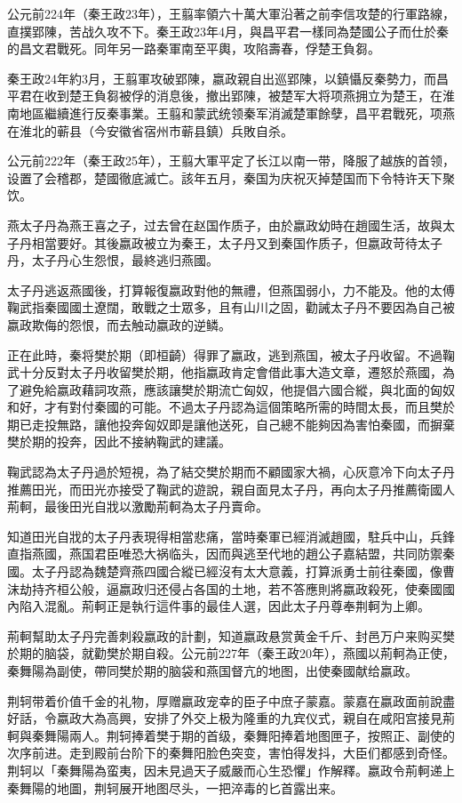 公元前224年（秦王政23年），王翦率領六十萬大軍沿著之前李信攻楚的行軍路線，直撲郢陳，苦战久攻不下。秦王政23年4月，與昌平君一樣同為楚國公子而仕於秦的昌文君戰死。同年另一路秦軍南至平輿，攻陷壽春，俘楚王負芻。

秦王政24年約3月，王翦軍攻破郢陳，嬴政親自出巡郢陳，以鎮懾反秦勢力，而昌平君在收到楚王負芻被俘的消息後，撤出郢陳，被楚军大将项燕拥立为楚王，在淮南地區繼續進行反秦事業。王翦和蒙武统领秦军消滅楚軍餘孽，昌平君戰死，项燕在淮北的蕲县（今安徽省宿州市蕲县鎮）兵敗自杀。

公元前222年（秦王政25年），王翦大軍平定了长江以南一带，降服了越族的首领，设置了会稽郡，楚國徹底滅亡。該年五月，秦国为庆祝灭掉楚国而下令特许天下聚饮。

燕太子丹為燕王喜之子，过去曾在赵国作质子，由於嬴政幼時在趙國生活，故與太子丹相當要好。其後嬴政被立为秦王，太子丹又到秦国作质子，但嬴政苛待太子丹，太子丹心生怨恨，最終逃归燕國。

太子丹逃返燕國後，打算報復嬴政對他的無禮，但燕国弱小，力不能及。他的太傅鞠武指秦國國土遼闊，敢戰之士眾多，且有山川之固，勸誡太子丹不要因為自己被嬴政欺侮的怨恨，而去触动嬴政的逆鳞。

正在此時，秦将樊於期（即桓齮）得罪了嬴政，逃到燕国，被太子丹收留。不過鞠武十分反對太子丹收留樊於期，他指嬴政肯定會借此事大造文章，遷怒於燕國，為了避免給嬴政藉詞攻燕，應該讓樊於期流亡匈奴，他提倡六國合縱，與北面的匈奴和好，才有對付秦國的可能。不過太子丹認為這個策略所需的時間太長，而且樊於期已走投無路，讓他投奔匈奴即是讓他送死，自己總不能夠因為害怕秦國，而摒棄樊於期的投奔，因此不接納鞠武的建議。

鞠武認為太子丹過於短視，為了結交樊於期而不顧國家大禍，心灰意冷下向太子丹推薦田光，而田光亦接受了鞠武的遊說，親自面見太子丹，再向太子丹推薦衛國人荊軻，最後田光自戕以激勵荊軻為太子丹賣命。

知道田光自戕的太子丹表現得相當悲痛，當時秦軍已經消滅趙國，駐兵中山，兵鋒直指燕國，燕国君臣唯恐大祸临头，因而與逃至代地的趙公子嘉結盟，共同防禦秦國。太子丹認為魏楚齊燕四國合縱已經沒有太大意義，打算派勇士前往秦國，像曹沫劫持齐桓公般，逼嬴政归还侵占各国的土地，若不答應則將嬴政殺死，使秦國國內陷入混亂。荊軻正是執行這件事的最佳人選，因此太子丹尊奉荆軻为上卿。

荊軻幫助太子丹完善刺殺嬴政的計劃，知道嬴政悬赏黄金千斤、封邑万户来购买樊於期的脑袋，就勸樊於期自殺。公元前227年（秦王政20年），燕國以荊軻為正使，秦舞陽為副使，帶同樊於期的脑袋和燕国督亢的地图，出使秦國献给嬴政。

荆轲带着价值千金的礼物，厚赠嬴政宠幸的臣子中庶子蒙嘉。蒙嘉在嬴政面前說盡好話，令嬴政大為高興，安排了外交上极为隆重的九宾仪式，親自在咸阳宫接見荊軻與秦舞陽兩人。荆轲捧着樊于期的首级，秦舞阳捧着地图匣子，按照正、副使的次序前进。走到殿前台阶下的秦舞阳脸色突变，害怕得发抖，大臣们都感到奇怪。荆轲以「秦舞陽為蛮夷，因未見過天子威嚴而心生恐懼」作解釋。嬴政令荊軻递上秦舞陽的地圖，荆轲展开地图尽头，一把淬毒的匕首露出来。

